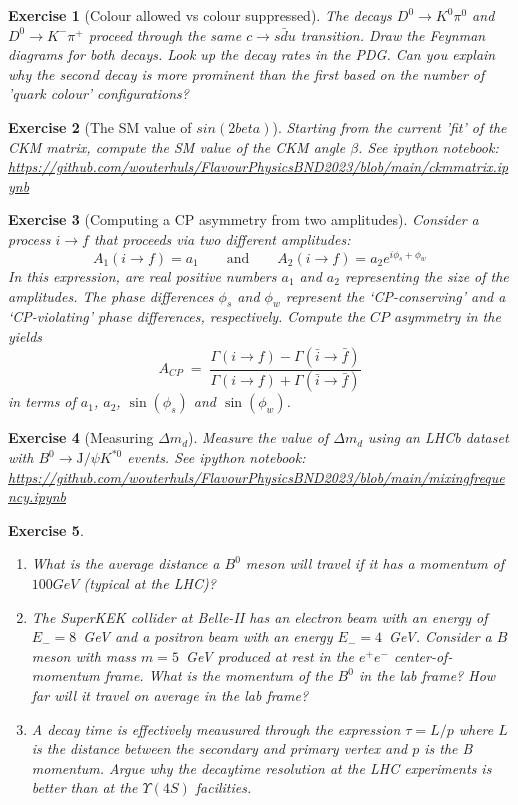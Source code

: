 \documentclass[12pt]{article}
\newcommand{\nbexercise}[1]{\url{https://github.com/wouterhuls/FlavourPhysicsBND2023/blob/main/#1}}
\newtheorem{homeworkexercise}{Exercise}
\newenvironment{enumexercise}{
  \renewcommand{\labelenumi}{\bfseries{(\alph{enumi})}}
  \leavevmode\begin{enumerate}}{\end{enumerate}\vspace{5pt}}
\newcommand{\jpsi}{\ensuremath{\mathrm{J/}\psi}}
\begin{document}
\begin{homeworkexercise}[Colour allowed vs colour suppressed]
  The decays $D^0 \to K^0 \pi^0$ and $D^0 \to K^- \pi^+$ proceed through the same $c \to s \bar{d} u$ transition. Draw the Feynman diagrams for both decays. Look up the decay rates in the PDG. Can you explain why the second decay is more prominent than the first based on the number of 'quark colour' configurations?
\end{homeworkexercise}

\begin{homeworkexercise}[The SM value of $sin(2beta)$]
  Starting from the current 'fit' of the CKM matrix, compute the SM value of the CKM angle $\beta$.
  See ipython notebook: \nbexercise{ckmmatrix.ipynb}
\end{homeworkexercise}

\begin{homeworkexercise}[Computing a CP asymmetry from two amplitudes]
  Consider a process $ i \to f $ that proceeds via two different amplitudes:
  \[
    A_1(i \to f) = a_1 \qquad \text{and} \qquad
    A_2(i \to f) = a_2 e^{i \phi_s + \phi_w}
  \]
  In this expression, are real positive numbers $a_1$ and $a_2$ representing the size of the amplitudes. The phase differences $\phi_s$ and $\phi_w$ represent the `CP-conserving' and a `CP-violating' phase differences, respectively.   Compute the $CP$ asymmetry in the yields
  \[
    A_{CP} \; = \;
    \frac{ \Gamma(i\to f) - \Gamma( \bar{i} \to \bar{f} ) }
    { \Gamma(i\to f) + \Gamma( \bar{i} \to \bar{f} ) }
  \]
  in terms of $a_1$, $a_2$, $\sin(\phi_s)$ and $\sin(\phi_w)$.
\end{homeworkexercise}


\begin{homeworkexercise}[Measuring $\Delta m_d$]
  Measure the value of $\Delta m_d$ using an LHCb dataset with $B^0 \to \jpsi K^{*0}$ events. See ipython notebook: \nbexercise{mixingfrequency.ipynb}  
\end{homeworkexercise}

\begin{homeworkexercise}
  \begin{enumexercise}
  \item What is the average distance a $B^0$ meson will travel if it has a momentum of $100 GeV$ (typical at the LHC)?
  \item The SuperKEK collider at Belle-II has an electron beam with an energy of $E_- = 8$~GeV and a positron beam with an energy $E_- = 4$~GeV. Consider a $B$ meson with mass $m=5$~GeV produced at rest in the $e^+ e^-$ center-of-momentum frame. What is the momentum of the $B^0$ in the lab frame? How far will it travel on average in the lab frame?
  \item A decay time is effectively meausured through the expression $\tau = L / p$ where $L$ is the distance between the secondary and primary vertex and $p$ is the B momentum. Argue why the decaytime resolution at the LHC experiments is better than at the $\Upsilon(4S)$ facilities.
  \end{enumexercise}
\end{homeworkexercise}
  
\end{document}
